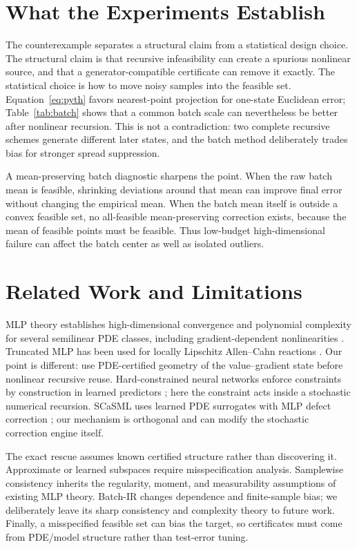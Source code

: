 \section{What the Experiments Establish}
The counterexample separates a structural claim from a statistical design choice. The structural claim is that recursive infeasibility can create a spurious nonlinear source, and that a generator-compatible certificate can remove it exactly. The statistical choice is how to move noisy samples into the feasible set. Equation~\eqref{eq:pyth} favors nearest-point projection for one-state Euclidean error; Table~\ref{tab:batch} shows that a common batch scale can nevertheless be better after nonlinear recursion. This is not a contradiction: two complete recursive schemes generate different later states, and the batch method deliberately trades bias for stronger spread suppression.

A mean-preserving batch diagnostic sharpens the point. When the raw batch mean is feasible, shrinking deviations around that mean can improve final error without changing the empirical mean. When the batch mean itself is outside a convex feasible set, no all-feasible mean-preserving correction exists, because the mean of feasible points must be feasible. Thus low-budget high-dimensional failure can affect the batch center as well as isolated outliers.

\section{Related Work and Limitations}
MLP theory establishes high-dimensional convergence and polynomial complexity for several semilinear PDE classes, including gradient-dependent nonlinearities \citep{E2021,HutzenthalerKruse2020,NeufeldWu2025,NeufeldNguyenWu2025}. Truncated MLP has been used for locally Lipschitz Allen--Cahn reactions \citep{Beck2020}. Our point is different: use PDE-certified geometry of the value--gradient state before nonlinear recursive reuse. Hard-constrained neural networks enforce constraints by construction in learned predictors \citep{Min2024}; here the constraint acts inside a stochastic numerical recursion. SCaSML uses learned PDE surrogates with MLP defect correction \citep{Fan2026}; our mechanism is orthogonal and can modify the stochastic correction engine itself.

The exact rescue assumes known certified structure rather than discovering it. Approximate or learned subspaces require misspecification analysis. Samplewise consistency inherits the regularity, moment, and measurability assumptions of existing MLP theory. Batch-IR changes dependence and finite-sample bias; we deliberately leave its sharp consistency and complexity theory to future work. Finally, a misspecified feasible set can bias the target, so certificates must come from PDE/model structure rather than test-error tuning.

